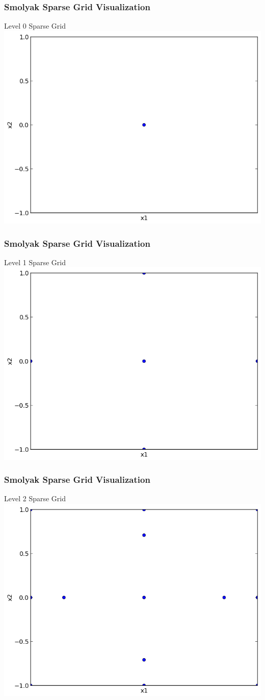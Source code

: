 \documentclass{beamer}
\begin{document}
\begin{frame}

\frametitle{Smolyak Sparse Grid Visualization}
\centering
Level 0 Sparse Grid
\includegraphics[width=.75\textwidth]{./sparse_grid_L0.png}

\end{frame}
\begin{frame}

\frametitle{Smolyak Sparse Grid Visualization}
\centering
Level 1 Sparse Grid
\includegraphics[width=.75\textwidth]{./sparse_grid_L1.png}

\end{frame}
\begin{frame}

\frametitle{Smolyak Sparse Grid Visualization}
\centering
Level 2 Sparse Grid
\includegraphics[width=.75\textwidth]{./sparse_grid_L2.png}

\end{frame}
\end{document}
